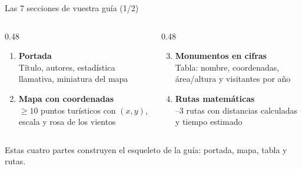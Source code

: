 \documentclass[aspectratio=169, 10pt, spanish]{beamer}
\begin{document}
\begin{frame}{Las 7 secciones de vuestra guía (1/2)}
  \begin{columns}[T]
    \begin{column}{0.48\textwidth}
      \begin{enumerate}
        \item[\faBookOpen] \textbf{Portada}\\
          {\AlmFontFootnote Título, autores, estadística llamativa, miniatura del mapa}
        \vspace{4pt}
        \item[\faMapMarkerAlt] \textbf{Mapa con coordenadas}\\
          {\AlmFontFootnote $\geq 10$ puntos turísticos con $(x,y)$, escala y rosa de los vientos}
      \end{enumerate}
    \end{column}
    \begin{column}{0.48\textwidth}
      \begin{enumerate}
        \setcounter{enumi}{2}
        \item[\faTable] \textbf{Monumentos en cifras}\\
          {\AlmFontFootnote Tabla: nombre, coordenadas, área/altura y visitantes por año}
        \vspace{4pt}
        \item[\faRoute] \textbf{Rutas matemáticas}\\
          {--3 rutas con distancias calculadas y tiempo estimado}
      \end{enumerate}
    \end{column}
  \end{columns}
  \vspace{8pt}
  \begin{notabox}[Consejo]
    \AlmFontFootnote
    Estas cuatro partes construyen el esqueleto de la guía:
    portada, mapa, tabla y rutas.
  \end{notabox}
\end{frame}
\end{document}
